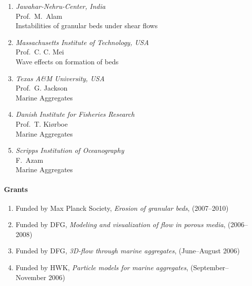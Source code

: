 \begin{enumerate}
\item {\sl Jawahar-Nehru-Center, India} \\ Prof.~M.~Alam \\
    Instabilities of granular beds under shear flows
\item {\sl Massachusetts Institute of Technology, USA} \\
    Prof.~C. C. Mei \\
    Wave effects on formation of beds
\item {\sl Texas A\&M University, USA} \\ Prof.~G. Jackson \\ Marine Aggregates
\item {\sl Danish Institute for Fisheries Research} \\
    Prof.~T. Ki{\o}rboe \\ Marine Aggregates
\item {\sl Scripps Institution of Oceanography}       \\
    F.~Azam \\ Marine Aggregates

\end{enumerate}


\paragraph{Grants}
\begin{enumerate}

\item Funded by Max Planck Society, \emph{Erosion of granular
beds}, (2007--2010) \item Funded by DFG, \emph{Modeling and
visualization of flow in porous
      media}, (2006--2008)
\item Funded by DFG, \emph{3D-flow through marine aggregates},
      (June--August 2006)
\item  Funded by HWK, \emph{Particle models for marine
aggregates},
      (September--November 2006)
\end{enumerate}


%
